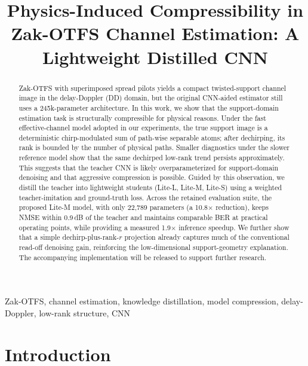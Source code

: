 \documentclass[conference]{IEEEtran}
\begin{document}
\title{Physics-Induced Compressibility in Zak-OTFS Channel Estimation: A Lightweight Distilled CNN}

\author{
}

\maketitle

\begin{abstract}
Zak-OTFS with superimposed spread pilots yields a compact twisted-support channel image in the delay-Doppler (DD) domain, but the original CNN-aided estimator still uses a 245k-parameter architecture. In this work, we show that the support-domain estimation task is structurally compressible for physical reasons. Under the fast effective-channel model adopted in our experiments, the true support image is a deterministic chirp-modulated sum of path-wise separable atoms; after dechirping, its rank is bounded by the number of physical paths. Smaller diagnostics under the slower reference model show that the same dechirped low-rank trend persists approximately. This suggests that the teacher CNN is likely overparameterized for support-domain denoising and that aggressive compression is possible. Guided by this observation, we distill the teacher into lightweight students (Lite-L, Lite-M, Lite-S) using a weighted teacher-imitation and ground-truth loss. Across the retained evaluation suite, the proposed Lite-M model, with only 22,789 parameters (a 10.8$\times$ reduction), keeps NMSE within 0.9\,dB of the teacher and maintains comparable BER at practical operating points, while providing a measured 1.9$\times$ inference speedup. We further show that a simple dechirp-plus-rank-$r$ projection already captures much of the conventional read-off denoising gain, reinforcing the low-dimensional support-geometry explanation. The accompanying implementation will be released to support further research.
\end{abstract}

\begin{IEEEkeywords}
Zak-OTFS, channel estimation, knowledge distillation, model compression, delay-Doppler, low-rank structure, CNN
\end{IEEEkeywords}

\section{Introduction}
\label{sec:intro}
\end{document}
